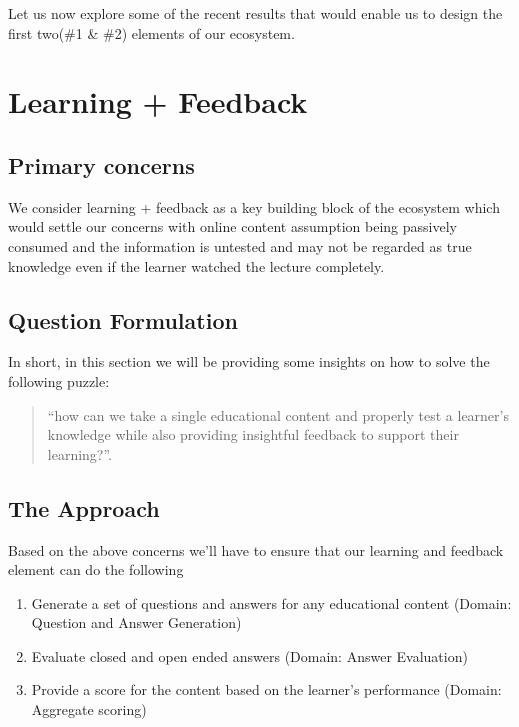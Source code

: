 \documentclass[]{book}
\providecommand{\tightlist}{%
  \setlength{\itemsep}{0pt}\setlength{\parskip}{0pt}}
\theoremstyle{definition}
\theoremstyle{definition}
\theoremstyle{definition}
\theoremstyle{remark}
\begin{document}
Let us now explore some of the recent results that would enable us to
design the first two(\#1 \& \#2) elements of our ecosystem.

\section{Learning + Feedback}\label{learning-feedback}

\subsection{Primary concerns}\label{primary-concerns-1}

We consider learning + feedback as a key building block of the ecosystem
which would settle our concerns with online content assumption being
passively consumed and the information is untested and may not be
regarded as true knowledge even if the learner watched the lecture
completely.

\subsection{Question Formulation}\label{question-formulation}

In short, in this section we will be providing some insights on how to
solve the following puzzle:

\begin{quote}
``how can we take a single educational content and properly test a
learner's knowledge while also providing insightful feedback to support
their learning?''.
\end{quote}

\subsection{The Approach}\label{the-approach}

Based on the above concerns we'll have to ensure that our learning and
feedback element can do the following

\begin{enumerate}
\def\labelenumi{\arabic{enumi}.}
\tightlist
\item
  Generate a set of questions and answers for any educational content
  (Domain: Question and Answer Generation)
\item
  Evaluate closed and open ended answers (Domain: Answer Evaluation)
\item
  Provide a score for the content based on the learner's performance
  (Domain: Aggregate scoring)
\end{enumerate}
\end{document}
